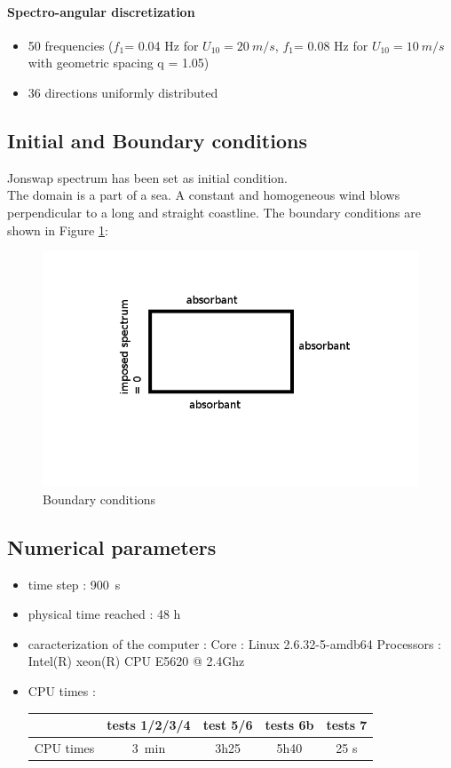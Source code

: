 \paragraph{Spectro-angular discretization}
\begin{itemize}
\item 50 frequencies ($f_1 $= 0.04 Hz for $U_{10} = 20~m/s$, $f_1 $= 0.08 Hz for $U_{10} = 10~m/s$ with geometric spacing q = 1.05)
\item 36 directions uniformly distributed
\end{itemize}

\subsection{Initial and Boundary conditions}
Jonswap spectrum has been set as initial condition.\\
The domain is a part of a sea. A constant and homogeneous wind blows perpendicular to a long and straight coastline. The boundary conditions are shown in Figure \ref{boundaryfet}:
\begin{figure}
\centering
\includegraphics[scale=0.5]{boundarycond.jpg}
\caption{Boundary conditions}
\label{boundaryfet}
\end{figure}
\subsection{Numerical parameters}
\begin{itemize}
\item time step : 900~s
\item physical time reached : 48 h
\item caracterization of the computer : \subitem Core : Linux 2.6.32-5-amdb64 \subitem Processors : Intel(R)
xeon(R) CPU E5620 @ 2.4Ghz
\item CPU times : \\
\begin{tabular}{c|c|c|c|c}
 & tests 1/2/3/4 & test 5/6 &tests 6b & tests 7\\
 \hline
CPU times & 3~min & 3h25 & 5h40 & 25 s \\
\end{tabular}
\end{itemize}

